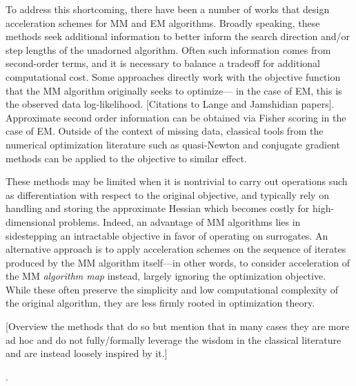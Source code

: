 \documentclass[12pt]{article}
\newcommand{\jx}[1]{{\color{blue}{ #1}}}
\begin{document}
\jx{I like to give a gentler overview of the motivation and some approaches. The more detailed background with equations etc can be included later in a prior work section. Here is a start:}
To address this shortcoming, there have been a number of works that design acceleration schemes for MM and EM algorithms. Broadly speaking, these methods seek additional information to better inform the search direction and/or step lengths of the unadorned algorithm. Often such information comes from second-order terms, and it is necessary to balance a tradeoff for additional computational cost.
Some approaches directly work with the objective function that the MM algorithm originally seeks to optimize--- in the case of EM, this is the observed data log-likelihood. [Citations to Lange and Jamshidian papers]. Approximate second order information can be obtained via Fisher scoring in the case of EM. Outside of the context of missing data,  classical tools from the numerical optimization literature such as quasi-Newton and conjugate gradient methods can be applied to the objective to similar effect.

These methods may be limited when it is nontrivial to carry out operations such as differentiation with respect to the original objective, and typically rely on handling and storing the approximate Hessian which becomes costly for high-dimensional problems. Indeed, an advantage of MM algorithms lies in sidestepping an intractable objective in favor of operating on surrogates. An alternative approach is to apply acceleration schemes on the sequence of iterates produced by the MM algorithm itself---in other words, to consider acceleration of the MM \textit{algorithm map} instead, largely ignoring the optimization objective. While these often preserve the simplicity and low computational complexity of the original algorithm, they are less firmly rooted in optimization theory. 

[Overview the methods that do so but mention that in many cases they are more ad hoc and do not fully/formally leverage the wisdom in the classical literature and are instead loosely inspired by it.]

\jx{Here I would ``close the introduction" to simply state our contributions and give a very high level description of our proposed approach, contextualizing it in the ``methodological gap" that has been roughly outlined prior. Some things we can highlight is by bridging it to Broyden's method, we get convergence guarantees [hopefully], a way to incorporate additional secant conditions (like Hua's method), efficient low-memory variations, and an explicit decomposition of search direction and step length information. In practice we find that it performs similarly if not better than existing simpler methods in terms of actual runtime, and as suggested by the theory is more robust/reliable across a broad range of settings. Then with that road map in mind the reader can later be exposed to the finer details}.
\end{document}
